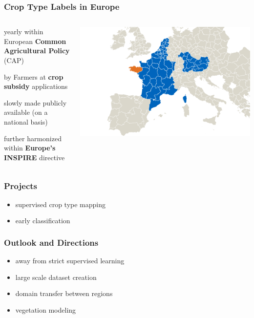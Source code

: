 \documentclass[%
  aspectratio=169,
  9pt,
  USenglish,
  titlegraphic, %
  affiliationintitlepagehead,
  progressbar,
]{beamer}
\begin{document}
\begin{frame}
\frametitle{Crop Type Labels in Europe}

\begin{columns}


\Large

\begin{description}\setlength\itemsep{1em}
\item[\color{tumblue}collected] yearly within European \textbf{Common Agricultural Policy} (CAP)
\item[\color{tumblue}declared] by Farmers at \textbf{crop subsidy} applications
\item[\color{tumblue}today] slowly made publicly available (on a national basis)
\item[\color{tumblue}in future] further harmonized within \textbf{Europe's INSPIRE} directive
\end{description}

\includegraphics[width=\textwidth]{images/europe_data2}


\end{columns}
\end{frame}



\begin{frame}
\frametitle{Projects}

\begin{itemize}
	\item supervised crop type mapping
	\item early classification
\end{itemize}

\end{frame}

\begin{frame}
	\frametitle{Outlook and Directions}
	\begin{itemize}
		\item away from strict supervised learning
		\item large scale dataset creation
		\item domain transfer between regions
		\item vegetation modeling
	\end{itemize}
\end{frame}
\end{document}
